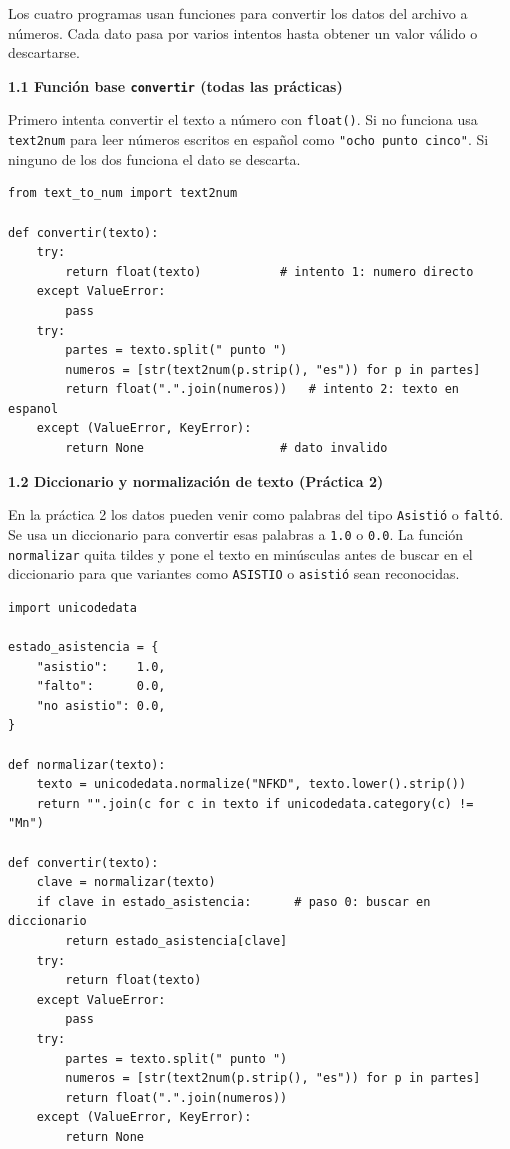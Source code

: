 \documentclass[12pt,oneside]{article}
\newcommand{\seccion}[1]{%
  \vspace{2mm}%
  \noindent\textbf{#1}%
  \vspace{1mm}%
}
\begin{document}
Los cuatro programas usan funciones para convertir los datos del archivo a números.
Cada dato pasa por varios intentos hasta obtener un valor válido o descartarse.

\seccion{1.1 Función base \texttt{convertir} (todas las prácticas)}

Primero intenta convertir el texto a número con \texttt{float()}. Si no funciona
usa \texttt{text2num} para leer números escritos en español como \texttt{"ocho punto cinco"}.
Si ninguno de los dos funciona el dato se descarta.

\begin{lstlisting}[caption={Función base convertir}]
from text_to_num import text2num

def convertir(texto):
    try:
        return float(texto)           # intento 1: numero directo
    except ValueError:
        pass
    try:
        partes = texto.split(" punto ")
        numeros = [str(text2num(p.strip(), "es")) for p in partes]
        return float(".".join(numeros))   # intento 2: texto en espanol
    except (ValueError, KeyError):
        return None                   # dato invalido
\end{lstlisting}

\seccion{1.2 Diccionario y normalización de texto (Práctica 2)}

En la práctica 2 los datos pueden venir como palabras del tipo \texttt{Asistió} o \texttt{faltó}.
Se usa un diccionario para convertir esas palabras a \texttt{1.0} o \texttt{0.0}.
La función \texttt{normalizar} quita tildes y pone el texto en minúsculas antes de buscar
en el diccionario para que variantes como \texttt{ASISTIO} o \texttt{asistió} sean reconocidas.

\begin{lstlisting}[caption={Diccionario y normalización -- Práctica 2}]
import unicodedata

estado_asistencia = {
    "asistio":    1.0,
    "falto":      0.0,
    "no asistio": 0.0,
}

def normalizar(texto):
    texto = unicodedata.normalize("NFKD", texto.lower().strip())
    return "".join(c for c in texto if unicodedata.category(c) != "Mn")

def convertir(texto):
    clave = normalizar(texto)
    if clave in estado_asistencia:      # paso 0: buscar en diccionario
        return estado_asistencia[clave]
    try:
        return float(texto)
    except ValueError:
        pass
    try:
        partes = texto.split(" punto ")
        numeros = [str(text2num(p.strip(), "es")) for p in partes]
        return float(".".join(numeros))
    except (ValueError, KeyError):
        return None
\end{lstlisting}
\end{document}
